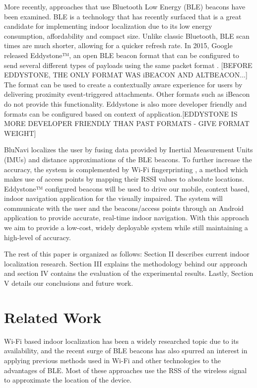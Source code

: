 \documentclass[conference]{IEEEtran}
\begin{document}
More recently, approaches that use Bluetooth Low Energy (BLE) beacons have been examined. BLE is a technology that has recently surfaced that is a great candidate for implementing indoor localization due to its low energy consumption, affordability and compact size. Unlike classic Bluetooth, BLE scan times are much shorter, allowing for a quicker refresh rate. In 2015, Google released Eddystone™, an open BLE beacon format that can be configured to send several different types of payloads using the same packet format \cite{developers.google.com}. [BEFORE EDDYSTONE, THE ONLY FORMAT WAS iBEACON AND ALTBEACON...] The format can be used to create a contextually aware experience for users by delivering proximity event-triggered attachments. Other formats such as iBeacon do not provide this functionality. Eddystone is also more developer friendly and formats can be configured based on context of application.[EDDYSTONE IS MORE DEVELOPER FRIENDLY THAN PAST FORMATS - GIVE FORMAT WEIGHT]

BluNavi localizes the user by fusing data provided by Inertial Measurement Units (IMUs) and distance approximations of the BLE beacons. To further increase the accuracy, the system is complemented by Wi-Fi fingerprinting , a method which makes use of access points by mapping their RSSI values to absolute locations. Eddystone™ configured beacons will be used to drive our mobile, context based, indoor navigation application for the visually impaired. The system will communicate with the user and the beacons/access points through an Android application to provide accurate, real-time indoor navigation. With this approach we aim to provide a low-cost, widely deployable system while still maintaining  a high-level of accuracy.

The rest of this paper is organized as follows: Section II describes current indoor localization research. Section III explains the methodology behind our approach and section IV contains the evaluation of the experimental results. Lastly, Section V details our conclusions and future work.

\section{Related Work}
Wi-Fi based indoor localization has been a widely researched topic due to its availability, and the recent surge of BLE beacons has also spurred an interest in applying previous methods used in Wi-Fi and other technologies to the advantages of BLE. Most of these approaches use the RSS of the wireless signal to approximate the location of the device.
\end{document}
